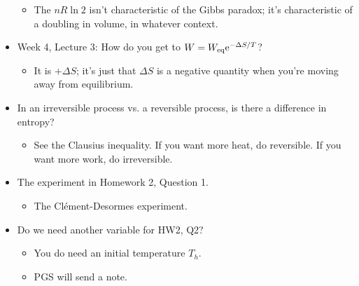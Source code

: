 \documentclass[../notes.tex]{subfiles}
\begin{document}
\begin{itemize}
\begin{itemize}
        \item The $nR\ln 2$ isn't characteristic of the Gibbs paradox; it's characteristic of a doubling in volume, in whatever context.
    \end{itemize}
    \item Week 4, Lecture 3: How do you get to $W=W_\text{eq}\e[-\Delta S/T]$?
    \begin{itemize}
        \item It is $+\Delta S$; it's just that $\Delta S$ is a negative quantity when you're moving away from equilibrium.
    \end{itemize}
    \item In an irreversible process vs. a reversible process, is there a difference in entropy?
    \begin{itemize}
        \item See the Clausius inequality. If you want more heat, do reversible. If you want more work, do irreversible.
    \end{itemize}
    \item The experiment in Homework 2, Question 1.
    \begin{itemize}
        \item The Cl\'{e}ment-Desormes experiment.
    \end{itemize}
    \item Do we need another variable for HW2, Q2?
    \begin{itemize}
        \item You do need an initial temperature $T_h$.
        \item PGS will send a note.
    \end{itemize}
\end{itemize}
\end{document}
